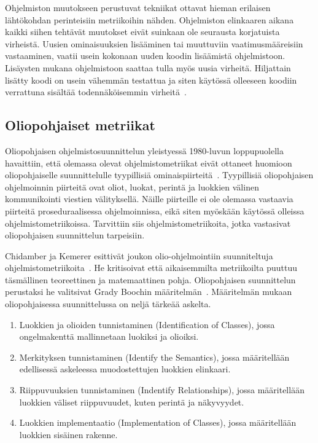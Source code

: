\documentclass[finnish]{tktltiki2}
\theoremstyle{definition}
\theoremstyle{remark}
\begin{document}
Ohjelmiston muutokseen perustuvat tekniikat ottavat hieman erilaisen lähtökohdan perinteisiin metriikoihin nähden. Ohjelmiston elinkaaren aikana kaikki siihen tehtävät muutokset eivät suinkaan ole seurausta korjatuista virheistä. Uusien ominaisuuksien lisääminen tai muuttuviin vaatimusmääreisiin vastaaminen, vaatii usein kokonaan uuden koodin lisäämistä ohjelmistoon. Lisäysten mukana ohjelmistoon saattaa tulla myös uusia virheitä. Hiljattain lisätty koodi on usein vähemmän testattua ja siten käytössä olleeseen koodiin verrattuna sisältää todennäköisemmin virheitä~\cite{ME98}.

\subsection{Oliopohjaiset metriikat}

Oliopohjaisen ohjelmistosuunnittelun yleistyessä 1980-luvun loppupuolella havaittiin, että olemassa olevat ohjelmistometriikat eivät ottaneet huomioon oliopohjaiselle suunnittelulle tyypillisiä ominaispiirteitä~\cite{LH93, CK94}. Tyypillisiä oliopohjaisen ohjelmoinnin piirteitä ovat oliot, luokat, perintä ja luokkien välinen kommunikointi viestien välityksellä. Näille piirteille ei ole olemassa vastaavia piirteitä proseduraalisessa ohjelmoinnissa, eikä siten myöskään käytössä olleissa ohjelmistometriikoissa. Tarvittiin siis ohjelmistometriikoita, jotka vastasivat oliopohjaisen suunnittelun tarpeisiin.

Chidamber ja Kemerer esittivät joukon olio-ohjelmointiin suunniteltuja ohjelmistometriikoita~\cite{CK91, CK94}. He kritisoivat että aikaisemmilta metriikoilta puuttuu täsmällinen teoreettinen ja matemaattinen pohja. Oliopohjaisen suunnittelun perustaksi he valitsivat Grady Boochin määritelmän~\cite{B94}. Määritelmän mukaan oliopohjaisessa suunnittelussa on neljä tärkeää askelta.
\begin{enumerate}
    \item Luokkien ja olioiden tunnistaminen (Identification of Classes), jossa ongelmakenttä mallinnetaan luokiksi ja olioiksi.
    \item Merkityksen tunnistaminen (Identify the Semantics), jossa määritellään edellisessä askeleessa muodostettujen luokkien elinkaari.
    \item Riippuvuuksien tunnistaminen (Indentify Relationships), jossa määritellään luokkien väliset riippuvuudet, kuten perintä ja näkyvyydet.
    \item Luokkien implementaatio (Implementation of Classes), jossa määritellään luokkien sisäinen rakenne.
\end{enumerate}
\end{document}
